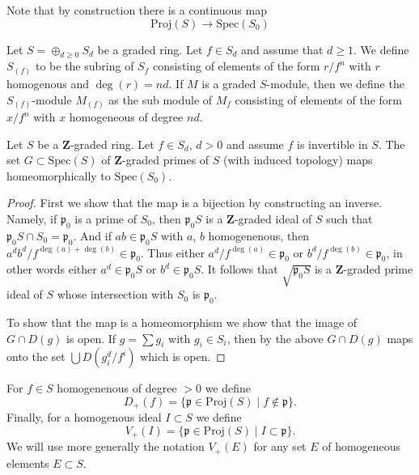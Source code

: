 \noindent
Note that by construction there is a continuous map
$$
\text{Proj}(S) \longrightarrow \text{Spec}(S_0)
$$

\medskip\noindent
Let $S = \oplus_{d \geq 0} S_d$ be a graded ring.
Let $f\in S_d$ and assume that $d \geq 1$.
We define $S_{(f)}$ to be the subring of $S_f$
consisting of elements of the form $r/f^n$ with $r$ homogenous and
$\deg(r) = nd$. If $M$ is a graded $S$-module,
then we define the $S_{(f)}$-module $M_{(f)}$ as the
sub module of $M_f$ consisting of elements of
the form $x/f^n$ with $x$ homogeneous of degree $nd$.

\begin{lemma}
\label{lemma-Z-graded}
Let $S$ be a $\mathbf{Z}$-graded ring.
Let $f \in S_d$, $d > 0$ and assume $f$ is invertible in $S$.
The set $G \subset \text{Spec}(S)$ of $\mathbf{Z}$-graded primes of $S$
(with induced topology) maps homeomorphically to $\text{Spec}(S_0)$.
\end{lemma}

\begin{proof}
First we show that the map is a bijection by constructing an inverse.
Namely, if $\mathfrak p_0$ is a prime of $S_0$, then $\mathfrak p_0S$
is a $\mathbf{Z}$-graded ideal of $S$ such that
$\mathfrak p_0S \cap S_0 = \mathfrak p_0$. And if $ab \in \mathfrak p_0S$
with $a$, $b$ homogenenous, then
$a^db^d/f^{\deg(a) + \deg(b)} \in \mathfrak p_0$.
Thus either $a^d/f^{\deg(a)} \in \mathfrak p_0$ or
$b^d/f^{\deg(b)} \in \mathfrak p_0$, in other words either
$a^d \in \mathfrak p_0S$ or $b^d \in \mathfrak p_0S$.
It follows that $\sqrt{\mathfrak p_0S}$ is a $\mathbf{Z}$-graded
prime ideal of $S$ whose intersection with $S_0$ is $\mathfrak p_0$.

\medskip\noindent
To show that the map is a homeomorphism we show that
the image of $G \cap D(g)$ is open. If $g = \sum g_i$
with $g_i \in S_i$, then by the above $G \cap D(g)$
maps onto the set $\bigcup D(g_i^d/f^i)$ which is open.
\end{proof}

\noindent
For $f \in S$ homogenenous of degree $> 0$ we define
$$
D_{+}(f) = \{ \mathfrak p \in \text{Proj}(S) \mid f \not\in \mathfrak p \}.
$$
Finally, for a homogenous ideal $I \subset S$ we define
$$
V_{+}(I) = \{ \mathfrak p \in \text{Proj}(S) \mid I \subset \mathfrak p \}.
$$
We will use more generally the notation $V_{+}(E)$ for any
set $E$ of homogeneous elements $E \subset S$.

